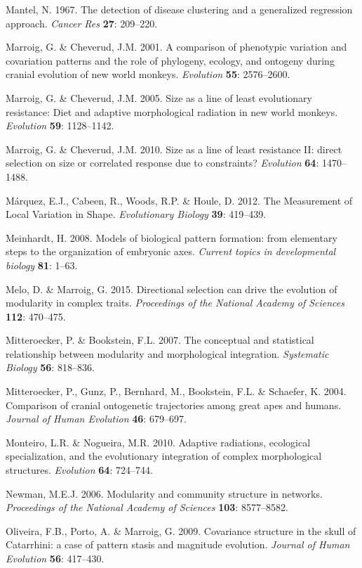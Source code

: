 \documentclass[12pt,]{article}
\begin{document}
Mantel, N. 1967. The detection of disease clustering and a generalized
regression approach. \emph{Cancer Res} \textbf{27}: 209--220.

Marroig, G. \& Cheverud, J.M. 2001. A comparison of phenotypic variation
and covariation patterns and the role of phylogeny, ecology, and
ontogeny during cranial evolution of new world monkeys. \emph{Evolution}
\textbf{55}: 2576--2600.

Marroig, G. \& Cheverud, J.M. 2005. Size as a line of least evolutionary
resistance: Diet and adaptive morphological radiation in new world
monkeys. \emph{Evolution} \textbf{59}: 1128--1142.

Marroig, G. \& Cheverud, J.M. 2010. Size as a line of least resistance
II: direct selection on size or correlated response due to constraints?
\emph{Evolution} \textbf{64}: 1470--1488.

Márquez, E.J., Cabeen, R., Woods, R.P. \& Houle, D. 2012. The
Measurement of Local Variation in Shape. \emph{Evolutionary Biology}
\textbf{39}: 419--439.

Meinhardt, H. 2008. Models of biological pattern formation: from
elementary steps to the organization of embryonic axes. \emph{Current
topics in developmental biology} \textbf{81}: 1--63.

Melo, D. \& Marroig, G. 2015. Directional selection can drive the
evolution of modularity in complex traits. \emph{Proceedings of the
National Academy of Sciences} \textbf{112}: 470--475.

Mitteroecker, P. \& Bookstein, F.L. 2007. The conceptual and statistical
relationship between modularity and morphological integration.
\emph{Systematic Biology} \textbf{56}: 818--836.

Mitteroecker, P., Gunz, P., Bernhard, M., Bookstein, F.L. \& Schaefer,
K. 2004. Comparison of cranial ontogenetic trajectories among great apes
and humans. \emph{Journal of Human Evolution} \textbf{46}: 679--697.

Monteiro, L.R. \& Nogueira, M.R. 2010. Adaptive radiations, ecological
specialization, and the evolutionary integration of complex
morphological structures. \emph{Evolution} \textbf{64}: 724--744.

Newman, M.E.J. 2006. Modularity and community structure in networks.
\emph{Proceedings of the National Academy of Sciences} \textbf{103}:
8577--8582.

Oliveira, F.B., Porto, A. \& Marroig, G. 2009. Covariance structure in
the skull of Catarrhini: a case of pattern stasis and magnitude
evolution. \emph{Journal of Human Evolution} \textbf{56}: 417--430.
\end{document}
